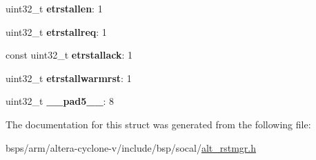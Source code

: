 \begin{DoxyCompactItemize}
\item 
\mbox{\label{structALT__RSTMGR__CTL__s_aca106d2238c5ea91870d58cebac3cebb}} 
uint32\+\_\+t {\bfseries etrstallen}\+: 1
\item 
\mbox{\label{structALT__RSTMGR__CTL__s_a4ec7bf180688d40448f62e459f6256b0}} 
uint32\+\_\+t {\bfseries etrstallreq}\+: 1
\item 
\mbox{\label{structALT__RSTMGR__CTL__s_a7849221e64f480a03f84eabf711a51b5}} 
const uint32\+\_\+t {\bfseries etrstallack}\+: 1
\item 
\mbox{\label{structALT__RSTMGR__CTL__s_af30c991e82d56b33376e9c43d4e9d3cd}} 
uint32\+\_\+t {\bfseries etrstallwarmrst}\+: 1
\item 
\mbox{\label{structALT__RSTMGR__CTL__s_a1399a91dd60b3cd3c02ad83974fb6dc4}} 
uint32\+\_\+t {\bfseries \+\_\+\+\_\+pad5\+\_\+\+\_\+}\+: 8
\end{DoxyCompactItemize}


The documentation for this struct was generated from the following file\+:\begin{DoxyCompactItemize}
\item 
bsps/arm/altera-\/cyclone-\/v/include/bsp/socal/\mbox{\hyperlink{alt__rstmgr_8h}{alt\+\_\+rstmgr.\+h}}\end{DoxyCompactItemize}
